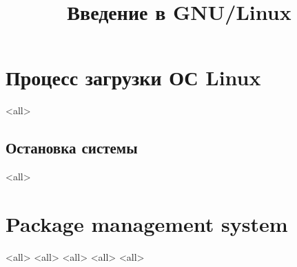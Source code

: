 

\title{Введение в GNU/Linux}





\begin{frame}
	\frametitle{}
	\titlepage
	\vspace{-0.5cm}
	\begin{center}
	\end{center}
\end{frame}



\section{Процесс загрузки ОС Linux}
\mode<all>{}
\subsection{Остановка системы}
\mode<all>{}

\section{Package management system}
\mode<all>{}
\mode<all>{}
\mode<all>{}
\mode<all>{}
\mode<all>{}



